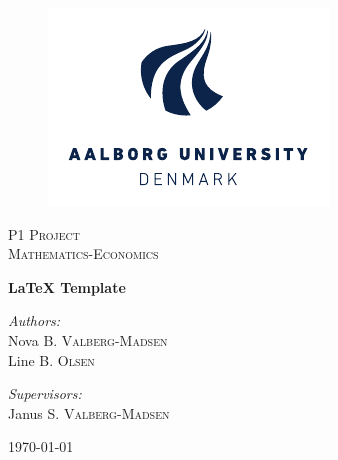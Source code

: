 
\begin{titlepage}
  \centering

  \begin{figure}[h]
    \centering
    \includegraphics[width=\textwidth]{fig/img/aau-logo-en.pdf}
  \end{figure}

  \vspace{2cm}
  
  \textsc{\LARGE P1 Project}\\
  \textsc{\Large Mathematics-Economics}

  \vspace{1cm}

  {\huge\bfseries \LaTeX{} Template}

  \vspace{2cm}

  \begin{minipage}[t]{0.4\textwidth}
    \begin{flushleft}
      \large
      \emph{Authors:}\\
      Nova \textsc{B. Valberg-Madsen}\\
      Line \textsc{B. Olsen}
    \end{flushleft}
  \end{minipage}
  \begin{minipage}[t]{0.4\textwidth}
    \begin{flushright}
      \large
      \emph{Supervisors:}\\
      Janus \textsc{S. Valberg-Madsen}
    \end{flushright}
  \end{minipage}

  \vfill

  {\large\today}
\end{titlepage}